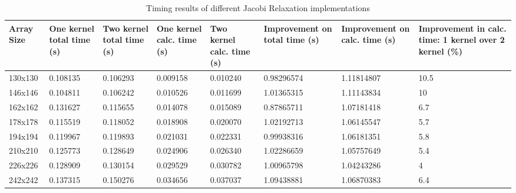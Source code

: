\documentclass[10pt]{article}
\begin{document}
\begin{multicols}{2}
    \begin{table*}[ht]\footnotesize
        \centering
        \begin{tabular}{ | p{1.3cm} | p{1.5cm} | p{1.5cm} | p{1.6cm} | p{1.6cm} | p{2cm} | p{1.9cm} | p{2cm} | }
            \hline
            Array Size  & One kernel total time (s) & Two kernel total time (s) & One kernel calc. time (s) & Two kernel calc. time (s) & Improvement on total time (s) & Improvement on calc. time (s) & Improvement in calc. time: 1 kernel over 2 kernel (\%) \\ \hline
            130x130 & 0.108135    & 0.106293    & 0.009158    & 0.010240    & 0.98296574  & 1.11814807  & 10.5  \\
            146x146 & 0.104811    & 0.106242    & 0.010526    & 0.011699    & 1.01365315  & 1.11143834  & 10    \\
            162x162 & 0.131627    & 0.115655    & 0.014078    & 0.015089    & 0.87865711  & 1.07181418  & 6.7   \\
            178x178 & 0.115519    & 0.118052    & 0.018908    & 0.020070    & 1.02192713  & 1.06145547  & 5.7   \\
            194x194 & 0.119967    & 0.119893    & 0.021031    & 0.022331    & 0.99938316  & 1.06181351  & 5.8   \\
            210x210 & 0.125773    & 0.128649    & 0.024906    & 0.026340    & 1.02286659  & 1.05757649  & 5.4   \\
            226x226 & 0.128909    & 0.130154    & 0.029529    & 0.030782    & 1.00965798  & 1.04243286  & 4     \\
            242x242 & 0.137315    & 0.150276    & 0.034656    & 0.037037    & 1.09438881  & 1.06870383  & 6.4   \\
            \hline
        \end{tabular}
        \caption{Timing results of different Jacobi Relaxation implementations}
        \label{tab:timing}
    \end{table*}


\end{multicols}
\end{document}
